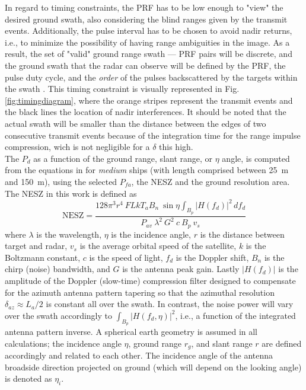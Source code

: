 \documentclass[conference,a4paper]{IEEEtran}
\begin{document}
    In regard to timing constraints, the PRF has to be low enough to "view" the desired ground swath, also considering the blind ranges given by the transmit events.
    Additionally, the pulse interval has to be chosen to avoid nadir returns, i.e., to minimize the possibility of having range ambiguities in the image.
    As a result, the set of "valid" ground range swath --- PRF pairs will be discrete, and the ground swath that the radar can observe will be defined by the PRF, the pulse duty cycle, and the \emph{order} of the pulses backscattered by the targets within the swath \cite{curlander1991synthetic}.
    This timing constraint is visually represented in Fig. \ref{fig:timingdiagram}, where the orange stripes represent the transmit events and the black lines the location of nadir interferences.
    It should be noted that the actual swath will be smaller than the distance between the edges of two consecutive transmit events because of the integration time for the range impulse compression, wich is not negligible for a $\delta$ this high.\\
    The $P_d$ as a function of the ground range, slant range, or $\eta$ angle, is computed from the equations in \cite{DLRjournal} for \emph{medium} ships (with length comprised between 25~m and 150~m), using the selected $P_{fa}$, the NESZ and the ground resolution area.
    The NESZ in this work is defined as
    \begin{equation}
        \text{NESZ} =\dfrac{128 \pi^3 r^4\ F L k T_a B_n\  \sin{\eta}\int_{B_p}\left| H(f_d) \right|^2\, df_d}{P_{av}\  \lambda^2\ G^2\ c\ B_p\ v_s}
        \label{eq:nesz}
    \end{equation}
    where $\lambda$ is the wavelength, $\eta$ is the incidence angle, $r$ is the distance between target and radar, $v_s$ is the average orbital speed of the satellite, $k$ is the Boltzmann constant, $c$ is the speed of light, $f_d$ is the Doppler shift, $B_n$ is the chirp (noise) bandwidth, and $G$ is the antenna peak gain.
    Lastly $|H(f_d)|$ is the amplitude of the Doppler (slow-time) compression filter designed to compensate for the azimuth antenna pattern tapering so that the azimuthal resolution $\delta_{az}\approx L_a/2$ is constant all over the swath.
    In contrast, the noise power will vary over the swath accordingly to $\int_{B_{p}}|H(f_d, \eta)|^2$, i.e., a function of the integrated antenna pattern inverse.
    A spherical earth geometry is assumed in all calculations;
    the incidence angle $\eta$, ground range $r_g$, and slant range $r$ are defined accordingly and related to each other.
    The incidence angle of the antenna broadside direction projected on ground (which will depend on the looking angle) is denoted as $\eta_i$.
\end{document}
